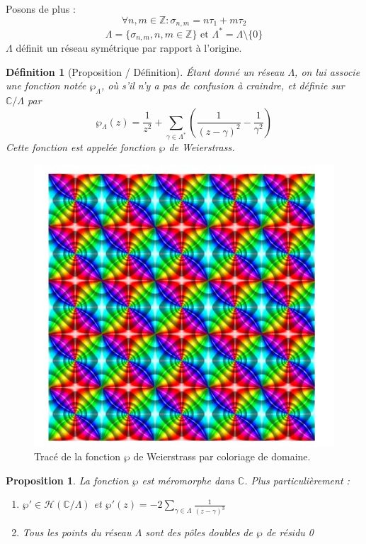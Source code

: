 \documentclass[12pt]{article}
\newtheorem{definition}{Définition}
\newtheorem{proposition}{Proposition}
\begin{document}
    Posons de plus :
    \[
    \forall n, m \in \mathbb{Z} : \sigma_{n, m} = n\tau_1 + m\tau_2
    \]
    \[
    \Lambda = \{\sigma_{n, m}, n, m \in \mathbb{Z}\} \text{ et } \Lambda^* = \Lambda \setminus \{0\}
    \]
    $\Lambda$ définit un réseau symétrique par rapport à l'origine.
    
    \begin{definition}[Proposition / Définition]
    Étant donné un réseau \( \Lambda \), on lui associe une fonction notée \( \wp_\Lambda \), où s'il n'y a pas de confusion à craindre, et définie sur \( \mathbb{C}/\Lambda \) par
    \[
        \wp_\Lambda(z) = \frac{1}{z^2} + \sum_{\gamma \in \Lambda^*} \left( \frac{1}{(z - \gamma)^2} - \frac{1}{\gamma^2} \right)
    \]
    Cette fonction est appelée fonction \( \wp \) de Weierstrass.
    \end{definition}
    
    \begin{figure}
        \centering
        \includegraphics[width=\linewidth]{weierstrass_function.jpeg}
        \caption{Tracé de la fonction $\wp$ de Weierstrass par coloriage de domaine.}
    \end{figure}
    
    \newpage
    \begin{proposition}
    La fonction \( \wp \) est méromorphe dans \( \mathbb{C} \). Plus particulièrement :
    \begin{enumerate}
        \item \( \wp' \in \mathcal{H}\left( \mathbb{C}/\Lambda \right)\) et \( \wp'(z) = -2 \sum_{\gamma \in \Lambda} \frac{1}{(z - \gamma)^3} \)
        \item Tous les points du réseau \( \Lambda \) sont des pôles doubles de \( \wp \) de résidu 0
    \end{enumerate}
    \end{proposition}
    
\end{document}
